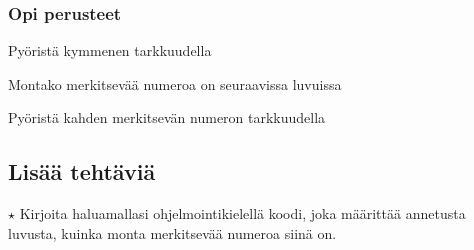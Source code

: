 \begin{tehtavasivu}
\subsubsection*{Opi perusteet}

\begin{tehtava}
Pyöristä kymmenen tarkkuudella
\begin{vastaus}
\end{vastaus}
\end{tehtava}

\begin{tehtava}
Montako merkitsevää numeroa on seuraavissa luvuissa
	\begin{vastaus}
	\end{vastaus}
\end{tehtava}

\begin{tehtava}
Pyöristä kahden merkitsevän numeron tarkkuudella
	\begin{vastaus}
	\end{vastaus}
\end{tehtava}




\subsection*{Lisää tehtäviä}

\begin{tehtava}
$\star$ Kirjoita haluamallasi ohjelmointikielellä koodi, joka määrittää annetusta luvusta, kuinka monta merkitsevää numeroa siinä on.
\end{tehtava}

\end{tehtavasivu}